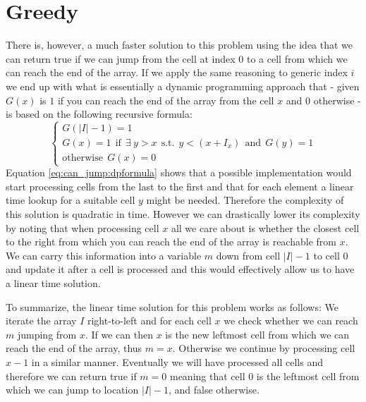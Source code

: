\section{Greedy}
\label{can_jump:sec:greedy}
There is, however, a much faster solution to this problem using the idea that we can return
true if we can jump from the cell at index $0$ to a cell from which we can reach the end of the
array. If we apply the same reasoning to generic index $i$ we end up with what is essentially a dynamic
programming approach that -  given $G(x)$ is $1$ if you can reach the end of the array from the cell
$x$ and $0$ otherwise - is based on the following recursive formula:
\begin{equation}
	\begin{cases}
		G(|I|-1) = 1 \\
		G(x) = 1 \: \: \text{if} \: \: \exists \: y > x \:\: \text{s.t.} \:\: y < (x+I_x) \: \: \text{and} \: \:G(y) = 1\\
		\text{otherwise} \: \: G(x) = 0
	 \end{cases}
	\label{eq:can_jump:dpformula}
\end{equation}
Equation \ref{eq:can_jump:dpformula} shows that a possible implementation would start processing
cells from the last to the first and that for each element a linear time lookup for a suitable cell
$y$ might be needed. Therefore the complexity of this solution is quadratic in time. However we can
drastically lower its complexity by noting that when processing cell $x$ all we care about is
whether the closest cell to the right from which you can reach the end of the array is reachable
from $x$. We can carry this information into a variable $m$ down from cell $|I|-1$ to cell $0$ and
update it after a cell is processed and this would effectively allow us to have a linear time
solution.

To summarize,  the linear time solution for this problem works as follows: We iterate the array $I$
right-to-left and for each cell $x$ we check whether we can reach $m$ jumping from $x$. If we can
then $x$ is the new leftmost cell from which we can reach the end of the array, thus $m = x$.
Otherwise we continue by processing cell $x-1$ in a similar manner. Eventually we will have
processed all cells and therefore we can return true if $m = 0$ meaning that cell $0$ is the
leftmost cell from which we can jump to location $|I|-1$, and false otherwise.



